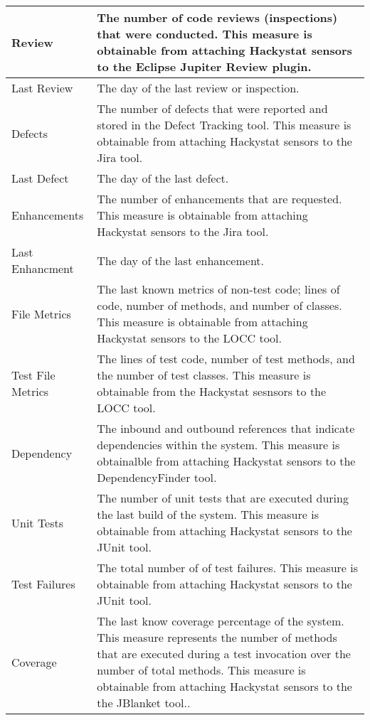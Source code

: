 \begin{table}[htbp]
\begin{center}
\begin{tabular}{|p{3.0cm}|p{10.0cm}|}
\small{}Review & \small{}The number of code reviews (inspections) that were
conducted. This measure is obtainable from attaching Hackystat sensors
to the Eclipse Jupiter Review plugin.\\ \hline
\small{}Last Review & \small{}The day of the last review or inspection. \\ \hline  

\small{}Defects & \small{}The number of defects that were reported and
stored in the Defect Tracking tool. This measure is obtainable from
attaching Hackystat sensors to the Jira tool.\\ \hline
\small{}Last Defect & \small{}The day of the last defect. \\ \hline

\small{}Enhancements & \small{}The number of enhancements that are
requested. This measure is obtainable from attaching Hackystat sensors to
the Jira tool.\\ \hline
\small{}Last Enhancment & \small{}The day of the last enhancement. \\ \hline

\small{}File Metrics & \small{}The last known metrics of non-test code;
lines of code, number of methods, and number of classes. This measure is
obtainable from attaching Hackystat sensors to the LOCC tool. \\ \hline
\small{}Test File Metrics & \small{}The lines of test code, number of test
methods, and the number of test classes. This measure is obtainable from
the Hackystat sesnsors to the LOCC tool. \\ \hline

\small{}Dependency & \small{}The inbound and outbound references that
indicate dependencies within the system. This measure is obtainalble
from attaching Hackystat sensors to the DependencyFinder tool.\\ \hline

\small{}Unit Tests & \small{}The number of unit tests that are executed
during the last build of the system. This measure is obtainable from
attaching Hackystat sensors to the JUnit tool. \\ \hline 

\small{}Test Failures & \small{}The total number of of test failures. This
measure is obtainable from attaching Hackystat sensors to the JUnit
tool. \\ \hline

\small{}Coverage & \small{}The last know coverage percentage of the
system. This measure represents the number of methods that are executed
during a test invocation over the number of total methods. This measure is
obtainable from attaching Hackystat sensors to the the JBlanket tool.. \\ \hline

    \end{tabular}
  \end{center}
\end{table}

